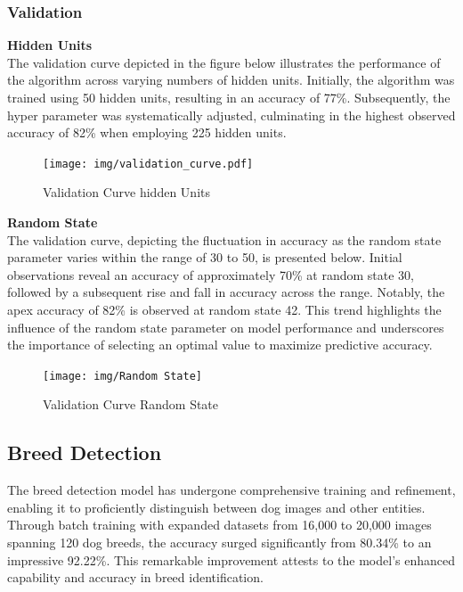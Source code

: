 \subsubsection{Validation}
\textbf{Hidden Units}\\
The validation curve depicted in the figure below illustrates the performance of the algorithm across varying numbers of hidden units. Initially, the algorithm was trained using 50 hidden units, resulting in an accuracy of 77\%. Subsequently, the hyper parameter was systematically adjusted, culminating in the highest observed accuracy of 82\% when employing 225 hidden units.
\vspace{0.7cm}
\begin{figure}[H]
\centering
\texttt{[image: img/validation\_curve.pdf]}
\caption{Validation Curve hidden Units}
\label{fig:system-overview}
\end{figure}
\newpage
\textbf{Random State}\\
The validation curve, depicting the fluctuation in accuracy as the random state parameter varies within the range of 30 to 50, is presented below. Initial observations reveal an accuracy of approximately 70\% at random state 30, followed by a subsequent rise and fall in accuracy across the range. Notably, the apex accuracy of 82\% is observed at random state 42. This trend highlights the influence of the random state parameter on model performance and underscores the importance of selecting an optimal value to maximize predictive accuracy.
\vspace{0.7cm}
\begin{figure}[H]
\centering
\texttt{[image: img/Random State]}
\caption{Validation Curve Random State}
\label{fig:system-overview}
\end{figure}
\newpage
\subsection{Breed Detection}
The breed detection model has undergone comprehensive training and refinement, enabling it to proficiently distinguish between dog images and other entities. Through batch training with expanded datasets from 16,000 to 20,000 images spanning 120 dog breeds, the accuracy surged significantly from 80.34\% to an impressive 92.22\%. This remarkable improvement attests to the model's enhanced capability and accuracy in breed identification. 

